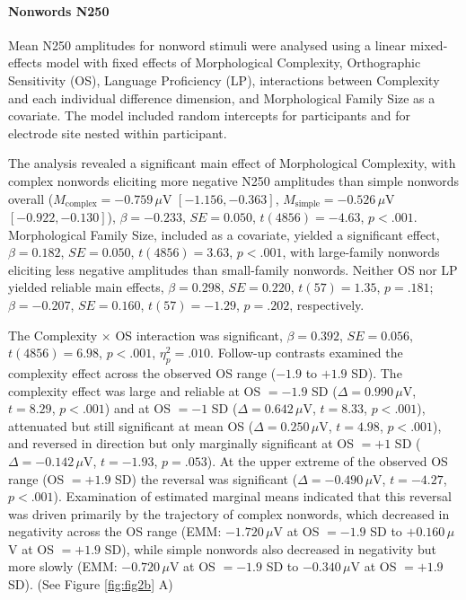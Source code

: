\documentclass[utf8]{FrontiersinHarvard} %
\begin{document}
	
	\paragraph*{Nonwords N250}
	
	Mean N250 amplitudes for nonword stimuli were analysed using a linear mixed-effects model with fixed effects of Morphological Complexity, Orthographic Sensitivity (OS), Language Proficiency (LP), interactions between Complexity and each individual difference dimension, and Morphological Family Size as a covariate. The model included random intercepts for participants and for electrode site nested within participant.
	
	The analysis revealed a significant main effect of Morphological Complexity, with complex nonwords eliciting more negative N250 amplitudes than simple nonwords overall ($M_{\text{complex}} = -0.759\,\mu$V $[-1.156, -0.363]$, $M_{\text{simple}} = -0.526\,\mu$V $[-0.922, -0.130]$), $\beta = -0.233$, $SE = 0.050$, $t(4856) = -4.63$, $p < .001$. Morphological Family Size, included as a covariate, yielded a significant effect, $\beta = 0.182$, $SE = 0.050$, $t(4856) = 3.63$, $p < .001$, with large-family nonwords eliciting less negative amplitudes than small-family nonwords. Neither OS nor LP yielded reliable main effects, $\beta = 0.298$, $SE = 0.220$, $t(57) = 1.35$, $p = .181$; $\beta = -0.207$, $SE = 0.160$, $t(57) = -1.29$, $p = .202$, respectively.
	
	The Complexity $\times$ OS interaction was significant, $\beta = 0.392$, $SE = 0.056$, $t(4856) = 6.98$, $p < .001$, $\eta^2_p = .010$. Follow-up contrasts examined the complexity effect across the observed OS range ($-1.9$ to $+1.9$ SD). The complexity effect was large and reliable at OS $= -1.9$ SD ($\Delta = 0.990\,\mu$V, $t = 8.29$, $p < .001$) and at OS $= -1$ SD ($\Delta = 0.642\,\mu$V, $t = 8.33$, $p < .001$), attenuated but still significant at mean OS ($\Delta = 0.250\,\mu$V, $t = 4.98$, $p < .001$), and reversed in direction but only marginally significant at OS $= +1$ SD ($\Delta = -0.142\,\mu$V, $t = -1.93$, $p = .053$). At the upper extreme of the observed OS range (OS $= +1.9$ SD) the reversal was significant ($\Delta = -0.490\,\mu$V, $t = -4.27$, $p < .001$). Examination of estimated marginal means indicated that this reversal was driven primarily by the trajectory of complex nonwords, which decreased in negativity across the OS range (EMM: $-1.720\,\mu$V at OS $= -1.9$ SD to $+0.160\,\mu$V at OS $= +1.9$ SD), while simple nonwords also decreased in negativity but more slowly (EMM: $-0.720\,\mu$V at OS $= -1.9$ SD to $-0.340\,\mu$V at OS $= +1.9$ SD). (See Figure \ref{fig:fig2b} A)
	
\end{document}
